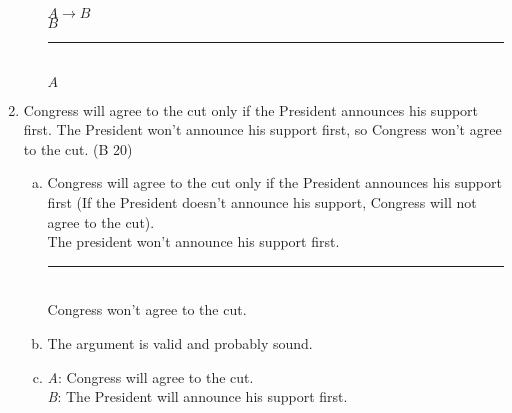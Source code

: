 \documentclass{article}
\begin{document}
\begin{enumerate}
\begin{enumerate}[(a)]
                        $A \to B$\\
                        $B$\\
                        \rule{5em}{.5pt}\\
                        $A$
            \end{enumerate}
      \item Congress will agree to the cut only if the President announces his support first. The President won't announce his support first, so Congress won't agree to the cut. (B 20)
            \begin{enumerate}[(a)]
                  \item Congress will agree to the cut only if the President announces his support first (If the President doesn't announce his support, Congress will not agree to the cut).\\
                        The president won't announce his support first.\\
                        \rule{15em}{.5pt}\\
                        Congress won't agree to the cut.
                  \item The argument is valid and probably sound.
                  \item \textit{A}: Congress will agree to the cut.\\
                        \textit{B}: The President will announce his support first.\\


\end{enumerate}
\end{enumerate}
\end{document}
